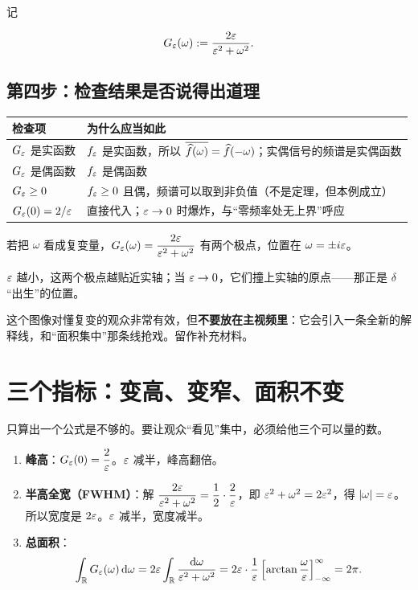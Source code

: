 记

\begin{equation}
G_\varepsilon(\omega):=\frac{2\varepsilon}{\varepsilon^{2}+\omega^{2}} .\label{eq:Geps}
\end{equation}

\subsection{第四步：检查结果是否说得出道理}

\begin{center}
\small
\renewcommand{\arraystretch}{1.3}
\begin{tabularx}{\textwidth}{@{}L{5.0cm}Y@{}}
\toprule
检查项 & 为什么应当如此 \\
\midrule
$G_\varepsilon$ 是实函数 & $f_\varepsilon$ 是实函数，所以 $\overline{\widehat{f}(\omega)}=\widehat{f}(-\omega)$；实偶信号的频谱是实偶函数 \\
$G_\varepsilon$ 是偶函数 & $f_\varepsilon$ 是偶函数 \\
$G_\varepsilon\ge0$ & $f_\varepsilon\ge0$ 且偶，频谱可以取到非负值（不是定理，但本例成立） \\
$G_\varepsilon(0)=2/\varepsilon$ & 直接代入；$\varepsilon\to0$ 时爆炸，与“零频率处无上界”呼应 \\
\bottomrule
\end{tabularx}
\end{center}

\begin{ideabox}
若把 $\omega$ 看成复变量，$G_\varepsilon(\omega)=\dfrac{2\varepsilon}{\varepsilon^{2}+\omega^{2}}$ 有两个极点，位置在 $\omega=\pm i\varepsilon$。

$\varepsilon$ 越小，这两个极点越贴近实轴；当 $\varepsilon\to0$，它们撞上实轴的原点——那正是 $\delta$ “出生”的位置。

这个图像对懂复变的观众非常有效，但\textbf{不要放在主视频里}：它会引入一条全新的解释线，和“面积集中”那条线抢戏。留作补充材料。
\end{ideabox}

\section{三个指标：变高、变窄、面积不变}

只算出一个公式是不够的。要让观众“看见”集中，必须给他三个可以量的数。

\begin{enumerate}[leftmargin=2em,itemsep=0.5em]
\item \textbf{峰高}：$G_\varepsilon(0)=\dfrac{2}{\varepsilon}$。$\varepsilon$ 减半，峰高翻倍。
\item \textbf{半高全宽（FWHM）}：解 $\dfrac{2\varepsilon}{\varepsilon^{2}+\omega^{2}}=\dfrac{1}{2}\cdot\dfrac{2}{\varepsilon}$，即 $\varepsilon^{2}+\omega^{2}=2\varepsilon^{2}$，得 $|\omega|=\varepsilon$。所以宽度是 $2\varepsilon$。$\varepsilon$ 减半，宽度减半。
\item \textbf{总面积}：
\begin{equation}
\int_{\mathbb{R}}G_\varepsilon(\omega)\mathop{}\!\mathrm{d}\omega
=2\varepsilon\int_{\mathbb{R}}\frac{\mathop{}\!\mathrm{d}\omega}{\varepsilon^{2}+\omega^{2}}
=2\varepsilon\cdot\frac{1}{\varepsilon}\left[\arctan\frac{\omega}{\varepsilon}\right]_{-\infty}^{\infty}
=2\pi .
\end{equation}
\end{enumerate}

